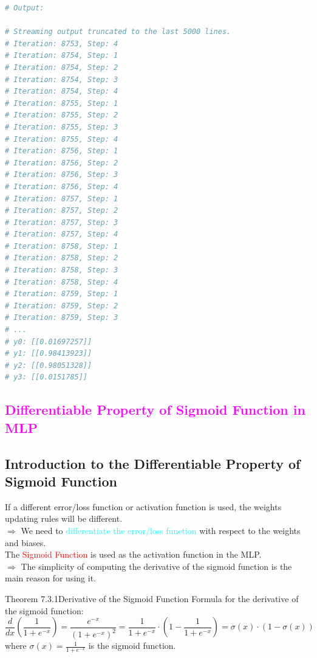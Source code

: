 \documentclass{book}
\begin{document}
\begin{lstlisting}[language=Python, basicstyle=\ttfamily\small, keywordstyle=\color{blue}, commentstyle=\color{forestgreen}, stringstyle=\color{red}, showstringspaces=false]
# Output:

# Streaming output truncated to the last 5000 lines.
# Iteration: 8753, Step: 4
# Iteration: 8754, Step: 1
# Iteration: 8754, Step: 2
# Iteration: 8754, Step: 3
# Iteration: 8754, Step: 4
# Iteration: 8755, Step: 1
# Iteration: 8755, Step: 2
# Iteration: 8755, Step: 3
# Iteration: 8755, Step: 4
# Iteration: 8756, Step: 1
# Iteration: 8756, Step: 2
# Iteration: 8756, Step: 3
# Iteration: 8756, Step: 4
# Iteration: 8757, Step: 1
# Iteration: 8757, Step: 2
# Iteration: 8757, Step: 3
# Iteration: 8757, Step: 4
# Iteration: 8758, Step: 1
# Iteration: 8758, Step: 2
# Iteration: 8758, Step: 3
# Iteration: 8758, Step: 4
# Iteration: 8759, Step: 1
# Iteration: 8759, Step: 2
# Iteration: 8759, Step: 3
# ...
# y0: [[0.01697257]]
# y1: [[0.98413923]]
# y2: [[0.98051328]]
# y3: [[0.0151785]]
\end{lstlisting}
\newpage
\textcolor{magenta}{\section{\textbf{Differentiable Property of Sigmoid Function in MLP}}}
\subsection{Introduction to the Differentiable Property of Sigmoid Function}
If a different error/loss function or activation function is used, the weights updating rules will be different.\\
$\Rightarrow$ We need to \textcolor{cyan}{differentiate the error/loss function} with respect to the weights and biases.\\
The \textcolor{red}{Sigmoid Function} is used as the activation function in the MLP.\\
$\Rightarrow$ The simplicity of computing the derivative of the sigmoid function is the main reason for using it.\\
\begin{thmBox}{Theorem 7.3.1}{Derivative of the Sigmoid Function}
    Formula for the derivative of the sigmoid function:
    \[
        \frac{d}{dx} \left(\frac{1}{1 + e^{-x}}\right) = \frac{e^{-x}}{(1 + e^{-x})^2} = \frac{1}{1 + e^{-x}} \cdot \left(1 - \frac{1}{1 + e^{-x}}\right) = \sigma(x) \cdot (1 - \sigma(x))
    \]
    where \(\sigma(x) = \frac{1}{1 + e^{-x}}\) is the sigmoid function.
\end{thmBox}
\end{document}
